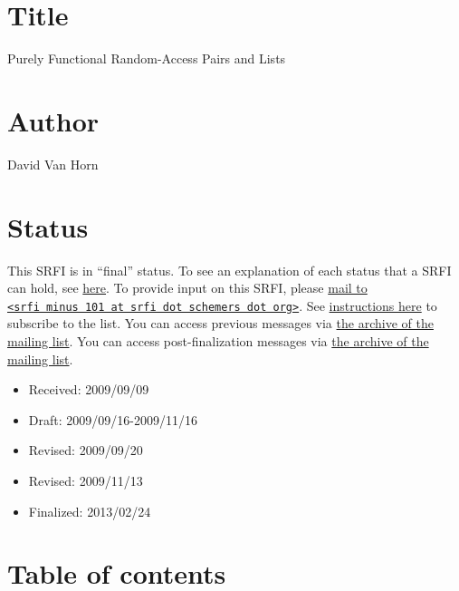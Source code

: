 \section{Title}\label{title}

Purely Functional Random-Access Pairs and Lists

\section{Author}\label{author}

David Van Horn

\section{Status}\label{status}

This SRFI is in ``final'' status. To see an explanation of each status
that a SRFI can hold, see
\href{http://srfi.schemers.org/srfi-process.html}{here}. To provide
input on this SRFI, please
\href{mailto:srfi\%20minus\%20101\%20at\%20srfi\%20dot\%20schemers\%20dot\%20org}{mail
to
\texttt{\textless{}srfi\ minus\ 101\ at\ srfi\ dot\ schemers\ dot\ org\textgreater{}}}.
See \href{../srfi-list-subscribe.html}{instructions here} to subscribe
to the list. You can access previous messages via
\href{mail-archive/maillist.html}{the archive of the mailing list}. You
can access post-finalization messages via
\href{http://srfi.schemers.org/srfi-101/post-mail-archive/maillist.html}{the
archive of the mailing list}.

\begin{itemize}
\tightlist
\item
  Received: 2009/09/09
\item
  Draft: 2009/09/16-2009/11/16
\item
  Revised: 2009/09/20
\item
  Revised: 2009/11/13
\item
  Finalized: 2013/02/24
\end{itemize}

\section{Table of contents}\label{table-of-contents}

